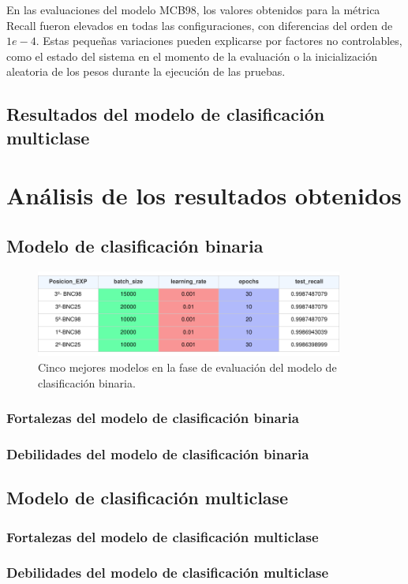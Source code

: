 En las evaluaciones del modelo MCB98, los valores obtenidos para la métrica Recall fueron elevados en todas las configuraciones, con diferencias del orden de $1e-4$. Estas pequeñas variaciones pueden explicarse por factores no controlables, como el estado del sistema en el momento de la evaluación o la inicialización aleatoria de los pesos durante la ejecución de las pruebas.

\subsection{Resultados del modelo de clasificación multiclase}
\section{Análisis de los resultados obtenidos}
\subsection{Modelo de clasificación binaria}

\begin{figure}[H]
    \centering
    \includegraphics[width=0.9\textwidth]{./img/evaluacion/top5EVALMCB.pdf}
    \caption{Cinco mejores modelos en la fase de evaluación del modelo de clasificación binaria.}
    \label{fig:top5EVALMCB}
\end{figure}

\subsubsection{Fortalezas del modelo de clasificación binaria}
\subsubsection{Debilidades del modelo de clasificación binaria}
\subsection{Modelo de clasificación multiclase}
\subsubsection{Fortalezas del modelo de clasificación multiclase}
\subsubsection{Debilidades del modelo de clasificación multiclase}
